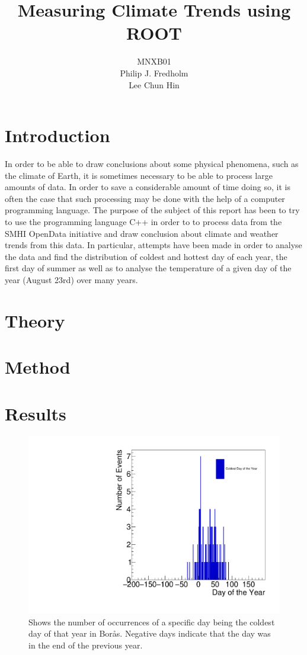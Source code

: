 \documentclass[a4, 12pt]{article}
\title{Measuring Climate Trends using ROOT}
\author{MNXB01 \\ Philip J. Fredholm \\Lee Chun Hin }
\begin{document}
\maketitle
\tableofcontents
\newpage

\section{Introduction}
In order to be able to draw conclusions about some physical phenomena, such as the climate of Earth, it is sometimes necessary to be able to process large amounts of data. In order to save a considerable amount of time doing so, it is often the case that such processing may be done with the help of a computer programming language. The purpose of the subject of this report has been to try to use the programming language C++ in order to to process data from the SMHI OpenData initiative and draw conclusion about climate and weather trends from this data. In particular, attempts have been made in order to analyse the data and find the distribution of coldest and hottest day of each year, the first day of summer as well as to analyse the temperature of a given day of the year (August 23rd) over many years.

\section{Theory}
\section{Method}
\section{Results}


\begin{figure}[H]
\centering
\includegraphics[scale=0.50]{philipCold.pdf}
\caption{Shows the number of occurrences of a specific day being the coldest day of that year in Borås. Negative days indicate that the day was in the end of the previous year.}
\end{figure}
\end{document}
